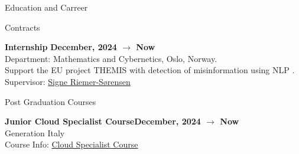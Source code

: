 \documentclass{resume} %
\begin{document}
\begin{rSection}{Education and Carreer}


%
%


        \begin{rSubsection2}{Contracts}

            \item\textbf{ Internship }\hfill \textbf{December, 2024 $\rightarrow$ Now}
            \\Department: Mathematics and Cybernetics, Oslo, Norway.
            \\Support the EU project THEMIS with detection of misinformation using NLP .
            \\Supervisor: \href{mailto:Signe.Riemer-Sorensen@sintef.no}{Signe Riemer-Sørensen}

        \end{rSubsection2}

        \begin{rSubsection2}{Post Graduation Courses}

            \item\textbf{Junior Cloud Specialist Course}\hfill \textbf{December, 2024 $\rightarrow$ Now}
            \\Generation Italy
            \\Course Info: \href{https://italy.generation.org/programs/cloud-specialist/}{Cloud Specialist Course}

        \end{rSubsection2}

    \end{rSection}
\end{document}
